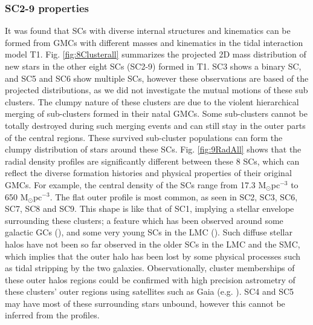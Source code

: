 \documentclass[fleqn,usenatbib]{mnras}
\begin{document}
\subsubsection{SC2-9 properties}

It was found that SCs with diverse internal structures and kinematics can be formed from GMCs with different masses and kinematics in the tidal interaction model T1. Fig. \ref{fig:8Clusterall} summarizes the projected 2D mass distribution of new stars in the other eight SCs (SC2-9) formed in T1. SC3 shows a binary SC, and SC5 and SC6 show multiple SCs, however these observations are based of the projected distributions, as we did not investigate the mutual motions of these sub clusters. The clumpy nature of these clusters are due to the violent hierarchical merging of sub-clusters formed in their natal GMCs. Some sub-clusters cannot be totally destroyed during such merging events and can still stay in the outer parts of the central regions. These survived sub-cluster populations can form the clumpy distribution of stars around these SCs. Fig. \ref{fig:9RadAll} shows that the radial density profiles are significantly different between these 8 SCs, which can reflect the diverse formation histories and physical properties of their original GMCs. For example, the central density of the SCs range from 17.3 M$_\odot$pc$^{-3}$ to 650 M$_\odot$pc$^{-3}$. The flat outer profile is most common, as seen in SC2, SC3, SC6, SC7, SC8 and SC9. This shape is like that of SC1, implying a stellar envelope surrounding these clusters; a feature which has been observed around some galactic GCs (\citealt{M1_Kuzma_Da_costa_Mackey2018}), and some very young SCs in the LMC (\citealt{K31Elson_Fall_Freeman1987}). Such diffuse stellar halos have not been so far observed in the older SCs in the LMC and the SMC, which implies that the outer halo has been lost by some physical processes such as tidal stripping by the two galaxies. 
Observationally, cluster memberships of these outer halos regions could be confirmed with high precision astrometry of these clusters' outer regions using satellites such as Gaia (e.g. \citealt{GaiaCollaboration_2021}). 
SC4 and SC5 may have most of these surrounding stars unbound, however this cannot be inferred from the profiles.
\end{document}
